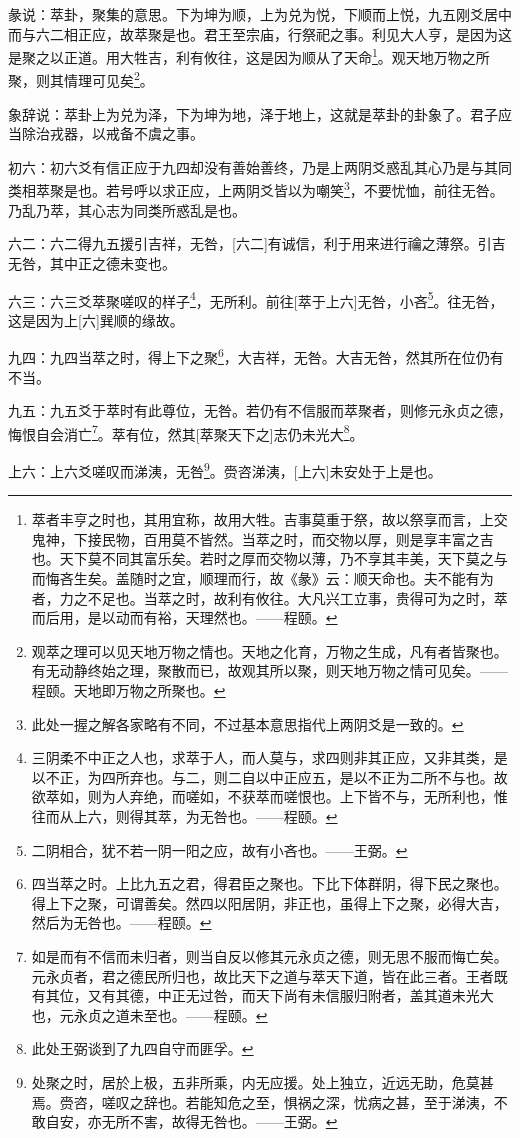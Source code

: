 \documentclass[12pt,oneside]{book}
\begin{document}
彖说：萃卦，聚集的意思。下为坤为顺，上为兑为悦，下顺而上悦，九五刚爻居中而与六二相正应，故萃聚是也。君王至宗庙，行祭祀之事。利见大人亨，是因为这是聚之以正道。用大牲吉，利有攸往，这是因为顺从了天命\footnote{萃者丰亨之时也，其用宜称，故用大牲。吉事莫重于祭，故以祭享而言，上交鬼神，下接民物，百用莫不皆然。当萃之时，而交物以厚，则是享丰富之吉也。天下莫不同其富乐矣。若时之厚而交物以薄，乃不享其丰美，天下莫之与而悔吝生矣。盖随时之宜，顺理而行，故《彖》云：顺天命也。夫不能有为者，力之不足也。当萃之时，故利有攸往。大凡兴工立事，贵得可为之时，萃而后用，是以动而有裕，天理然也。——程颐。}。观天地万物之所聚，则其情理可见矣\footnote{观萃之理可以见天地万物之情也。天地之化育，万物之生成，凡有者皆聚也。有无动静终始之理，聚散而已，故观其所以聚，则天地万物之情可见矣。——程颐。天地即万物之所聚也。}。

象辞说：萃卦上为兑为泽，下为坤为地，泽于地上，这就是萃卦的卦象了。君子应当除治戎器，以戒备不虞之事。

初六：初六爻有信正应于九四却没有善始善终，乃是上两阴爻惑乱其心乃是与其同类相萃聚是也。若号呼以求正应，上两阴爻皆以为嘲笑\footnote{此处一握之解各家略有不同，不过基本意思指代上两阴爻是一致的。}，不要忧恤，前往无咎。乃乱乃萃，其心志为同类所惑乱是也。

六二：六二得九五援引吉祥，无咎，[六二]有诚信，利于用来进行禴之薄祭。引吉无咎，其中正之德未变也。

六三：六三爻萃聚嗟叹的样子\footnote{三阴柔不中正之人也，求萃于人，而人莫与，求四则非其正应，又非其类，是以不正，为四所弃也。与二，则二自以中正应五，是以不正为二所不与也。故欲萃如，则为人弃绝，而嗟如，不获萃而嗟恨也。上下皆不与，无所利也，惟往而从上六，则得其萃，为无咎也。——程颐。}，无所利。前往[萃于上六]无咎，小吝\footnote{二阴相合，犹不若一阴一阳之应，故有小吝也。——王弼。}。往无咎，这是因为上[六]巽顺的缘故。

九四：九四当萃之时，得上下之聚\footnote{四当萃之时。上比九五之君，得君臣之聚也。下比下体群阴，得下民之聚也。得上下之聚，可谓善矣。然四以阳居阴，非正也，虽得上下之聚，必得大吉，然后为无咎也。——程颐。}，大吉祥，无咎。大吉无咎，然其所在位仍有不当。

九五：九五爻于萃时有此尊位，无咎。若仍有不信服而萃聚者，则修元永贞之德，悔恨自会消亡\footnote{如是而有不信而未归者，则当自反以修其元永贞之德，则无思不服而悔亡矣。元永贞者，君之德民所归也，故比天下之道与萃天下道，皆在此三者。王者既有其位，又有其德，中正无过咎，而天下尚有未信服归附者，盖其道未光大也，元永贞之道未至也。——程颐。}。萃有位，然其[萃聚天下之]志仍未光大\footnote{此处王弼谈到了九四自守而匪孚。}。

上六：上六爻嗟叹而涕洟，无咎\footnote{处聚之时，居於上极，五非所乘，内无应援。处上独立，近远无助，危莫甚焉。赍咨，嗟叹之辞也。若能知危之至，惧祸之深，忧病之甚，至于涕洟，不敢自安，亦无所不害，故得无咎也。——王弼。}。赍咨涕洟，[上六]未安处于上是也。
\end{document}

